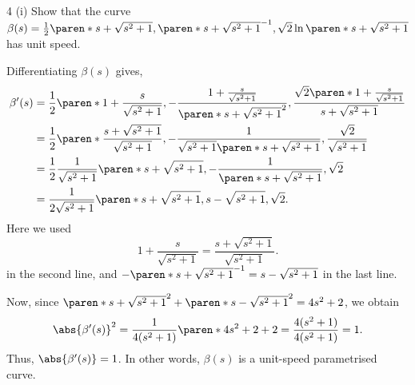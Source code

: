 \documentclass[11pt]{penrose}
\begin{document}
\begin{problem}{4 (i)}
    Show that the curve $\beta(s) = \frac{1}{2}\paren*{s + \sqrt{s^2 + 1}, \paren*{s + \sqrt{s^2 + 1}}^{-1}, \sqrt{2}\ln\paren*{s + \sqrt{s^2 + 1}}}$ has unit speed.

    \solution Differentiating $\beta(s)$ gives,
    \begin{align*}
        \beta'(s)
        &= \frac{1}{2}
        \paren*{
            1 + \frac{s}{\sqrt{s^2 + 1}},
            -\frac{1 + \frac{s}{\sqrt{s^2 + 1}}}{\paren*{s + \sqrt{s^2 + 1}}^2},
            \frac{ \sqrt{2} \paren*{1 + \frac{s}{\sqrt{s^2 + 1}}} }{ s + \sqrt{s^2 + 1} }
        }\\
        &= \frac{1}{2}
        \paren*{
            \frac{ s + \sqrt{s^2 + 1} }{ \sqrt{s^2 + 1} },
            -\frac{1}{\sqrt{s^2 + 1} \paren*{s + \sqrt{s^2 + 1}}},
            \frac{ \sqrt{2} }{ \sqrt{s^2 + 1} }
        }\\
        &= \frac{1}{2} \frac{1}{\sqrt{s^2 + 1}}
        \paren*{s + \sqrt{s^2 + 1}, -\frac{1}{\paren*{s + \sqrt{s^2 + 1}}}, \sqrt{2} }\\
        &= \frac{1}{2\sqrt{s^2 + 1}}
        \paren*{s + \sqrt{s^2 + 1}, s - \sqrt{s^2 + 1}, \sqrt{2} }.
    \end{align*}
    Here we used
    \begin{equation*}
        1 + \frac{s}{\sqrt{s^2 + 1}} = \frac{ s + \sqrt{s^2 + 1} }{ \sqrt{s^2 + 1} }.
    \end{equation*}
    in the second line, and $-\paren*{s + \sqrt{s^2 + 1}}^{-1} = s - \sqrt{s^2 + 1}$ in the last line.

    Now, since $\paren*{s + \sqrt{s^2 + 1}}^2 + \paren*{s - \sqrt{s^2 + 1}}^2 = 4s^2 + 2$, we obtain
    \begin{equation*}
        \abs{\beta'(s)}^2
        = \frac{ 1 }{4(s^2 + 1)} \paren*{4s^2 + 2 + 2 }
        = \frac{ 4(s^2 + 1) }{4(s^2 + 1)}
        = 1.
    \end{equation*}
    Thus, $\abs{\beta'(s)} = 1$. In other words, $\beta(s)$ is a unit-speed parametrised curve.
\end{problem}
\end{document}
